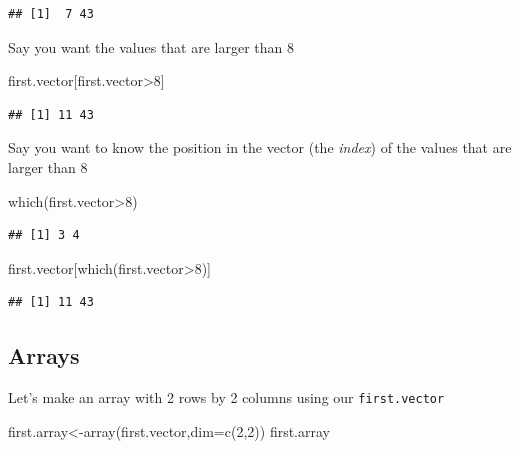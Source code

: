 \documentclass[
]{gitbook}
\newenvironment{Shaded}{\begin{snugshade}}{\end{snugshade}}
\newcommand{\AttributeTok}[1]{\textcolor[rgb]{0.77,0.63,0.00}{#1}}
\newcommand{\DecValTok}[1]{\textcolor[rgb]{0.00,0.00,0.81}{#1}}
\newcommand{\FunctionTok}[1]{\textcolor[rgb]{0.00,0.00,0.00}{#1}}
\newcommand{\NormalTok}[1]{#1}
\newcommand{\OtherTok}[1]{\textcolor[rgb]{0.56,0.35,0.01}{#1}}
\newcommand{\SpecialCharTok}[1]{\textcolor[rgb]{0.00,0.00,0.00}{#1}}
\begin{document}
\begin{verbatim}
## [1]  7 43
\end{verbatim}

Say you want the values that are larger than 8

\begin{Shaded}
\begin{Highlighting}[]
\NormalTok{first.vector[first.vector}\SpecialCharTok{\textgreater{}}\DecValTok{8}\NormalTok{]}
\end{Highlighting}
\end{Shaded}

\begin{verbatim}
## [1] 11 43
\end{verbatim}

Say you want to know the position in the vector (the \emph{index}) of the values that are larger than 8

\begin{Shaded}
\begin{Highlighting}[]
\FunctionTok{which}\NormalTok{(first.vector}\SpecialCharTok{\textgreater{}}\DecValTok{8}\NormalTok{)}
\end{Highlighting}
\end{Shaded}

\begin{verbatim}
## [1] 3 4
\end{verbatim}

\begin{Shaded}
\begin{Highlighting}[]
\NormalTok{first.vector[}\FunctionTok{which}\NormalTok{(first.vector}\SpecialCharTok{\textgreater{}}\DecValTok{8}\NormalTok{)]}
\end{Highlighting}
\end{Shaded}

\begin{verbatim}
## [1] 11 43
\end{verbatim}

\hypertarget{arrays}{%
\subsection{Arrays}\label{arrays}}

Let's make an array with 2 rows by 2 columns using our \texttt{first.vector}

\begin{Shaded}
\begin{Highlighting}[]
\NormalTok{first.array}\OtherTok{\textless{}{-}}\FunctionTok{array}\NormalTok{(first.vector,}\AttributeTok{dim=}\FunctionTok{c}\NormalTok{(}\DecValTok{2}\NormalTok{,}\DecValTok{2}\NormalTok{))}
\NormalTok{first.array}
\end{Highlighting}
\end{Shaded}
\end{document}
